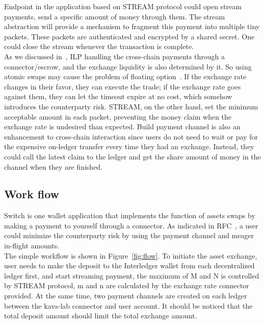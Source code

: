 \noindent Endpoint in the application based on STREAM protocol could open stream payments, send a specific amount of money through them. The stream abstraction will provide a mechanism to fragment this payment into multiple tiny packets. These packets are authenticated and encrypted by a shared secret. One could close the stream whenever the transaction is complete.\\

\noindent As we discussed in~, ILP handling the cross-chain payments through a connector/escrow, and the exchange liquidity is also determined by it. So using atomic swaps may cause the problem of floating option~\cite{cryptoeprint:2019:896}. If the exchange rate changes in their favor, they can execute the trade; if the exchange rate goes against them, they can let the timeout expire at no cost, which somehow introduces the counterparty risk. STREAM, on the other hand, set the minimum acceptable amount in each packet, preventing the money claim when the exchange rate is undesired than expected. Build payment channel is also an enhancement to cross-chain interaction since users do not need to wait or pay for the expensive on-ledger transfer every time they had an exchange. Instead, they could call the latest claim to the ledger and get the share amount of money in the channel when they are finished.

\subsection{Work flow}
\noindent Switch is one wallet application that implements the function of assets swaps by making a payment to yourself through a connector. As indicated in RFC~\cite{paymentchannel}, a user could minimize the counterparty risk by using the payment channel and meager in-flight amounts.\\

\noindent The simple workflow is shown in Figure~\ref{fig:flow}. To initiate the asset exchange, user needs to make the deposit to the Interledger wallet from each decentralized ledger first, and start streaming payment, the maximum of M and N is controlled by STREAM protocol, m and n are calculated by the exchange rate connector provided. At the same time, two payment channels are created on each ledger between the kava-lab connector and user account. It should be noticed that the total deposit amount should limit the total exchange amount.\\

